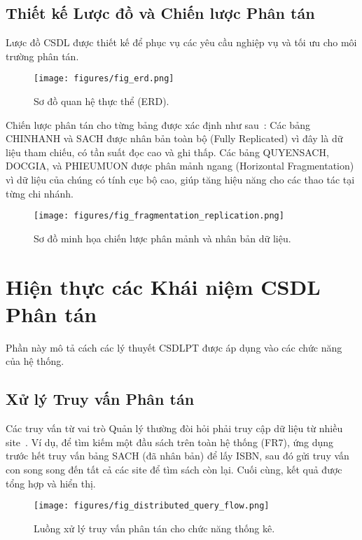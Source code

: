 \documentclass[conference]{IEEEtran}
\begin{document}
\subsection{Thiết kế Lược đồ và Chiến lược Phân tán}
Lược đồ CSDL được thiết kế để phục vụ các yêu cầu nghiệp vụ và tối ưu cho môi trường phân tán.

\begin{figure}[!h]
\centering
\texttt{[image: figures/fig\_erd.png]} 
\caption{Sơ đồ quan hệ thực thể (ERD).}
\label{fig_erd}
\end{figure}

Chiến lược phân tán cho từng bảng được xác định như sau~\cite{ozsu_valduriez_2020}:
Các bảng CHINHANH và SACH được nhân bản toàn bộ (Fully Replicated) vì đây là dữ liệu tham chiếu, có tần suất đọc cao và ghi thấp. Các bảng QUYENSACH, DOCGIA, và PHIEUMUON được phân mảnh ngang (Horizontal Fragmentation) vì dữ liệu của chúng có tính cục bộ cao, giúp tăng hiệu năng cho các thao tác tại từng chi nhánh.

\begin{figure}[!h]
\centering
\texttt{[image: figures/fig\_fragmentation\_replication.png]} 
\caption{Sơ đồ minh họa chiến lược phân mảnh và nhân bản dữ liệu.}
\label{fig_fragmentation_replication}
\end{figure}

\section{Hiện thực các Khái niệm CSDL Phân tán}
Phần này mô tả cách các lý thuyết CSDLPT được áp dụng vào các chức năng của hệ thống.

\subsection{Xử lý Truy vấn Phân tán}
Các truy vấn từ vai trò Quản lý thường đòi hỏi phải truy cập dữ liệu từ nhiều site~\cite{ozsu_valduriez_2020}. Ví dụ, để tìm kiếm một đầu sách trên toàn hệ thống (FR7), ứng dụng trước hết truy vấn bảng SACH (đã nhân bản) để lấy ISBN, sau đó gửi truy vấn con song song đến tất cả các site để tìm sách còn lại. Cuối cùng, kết quả được tổng hợp và hiển thị.

\begin{figure}[!h]
\centering
\texttt{[image: figures/fig\_distributed\_query\_flow.png]} 
\caption{Luồng xử lý truy vấn phân tán cho chức năng thống kê.}
\label{fig_distributed_query_flow}
\end{figure}
\end{document}
